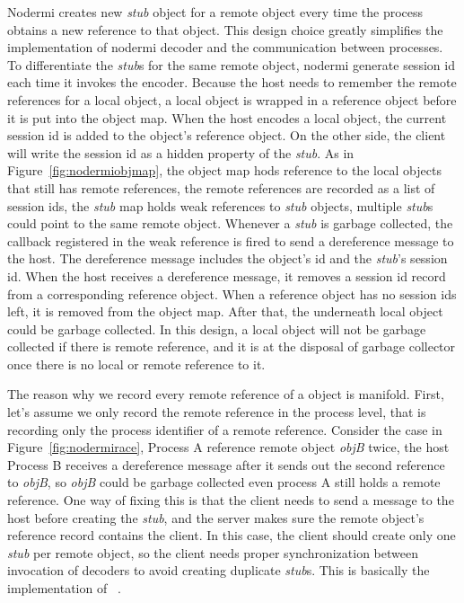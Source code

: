 Nodermi creates new \emph{stub} object for a remote object every time
the process obtains a new reference to that object.
This design choice greatly simplifies the implementation of nodermi decoder and
the communication between processes.
To differentiate the \emph{stub}s for the same remote object, 
nodermi generate session id each time it invokes the encoder.
Because the host needs to remember the remote references for a local object,
a local object is wrapped in a reference object before it is put into the object map.
When the host encodes a local object,
the current session id is added to the object's reference object.
On the other side, 
the client will write the session id as a hidden property of the \emph{stub}.
As in Figure~\ref{fig:nodermiobjmap}, the object map hods reference to 
the local objects that still has remote references, 
the remote references are recorded as a list of session ids,
the \emph{stub} map holds weak references to \emph{stub} objects,
multiple \emph{stub}s could point to the same remote object.
Whenever a \emph{stub} is garbage collected,
the callback registered in the weak reference is fired to send a dereference message
to the host.
The dereference message includes the object's id and the \emph{stub}'s session id.
When the host receives a dereference message, it removes a session id record from 
a corresponding reference object.
When a reference object has no session ids left, it is removed from the object map.
After that, the underneath local object could be garbage collected.
In this design, a local object will not be garbage collected if there is
remote reference, and it is at the disposal of garbage collector once there is
no local or remote reference to it.

\nodrmiracefig{}

The reason why we record every remote reference of a object is manifold.
First, let's assume we only record the remote reference in the process level,
that is recording only the process identifier of a remote reference.
Consider the case in Figure~\ref{fig:nodermirace},
Process A reference remote object \emph{objB} twice,
the host Process B receives a dereference message 
after it sends out the second reference to \emph{objB},
so \emph{objB} could be garbage collected even process A still holds a remote
reference.
One way of fixing this is that
the client needs to send a message to the host before creating the \emph{stub},
and the server makes sure the remote object's reference record contains the client.
In this case, the client should create only one \emph{stub} per remote object,
so the client needs proper synchronization between invocation of decoders to
avoid creating duplicate \emph{stub}s. This is basically the implementation 
of ~\cite{birrell1993distributed}. %


